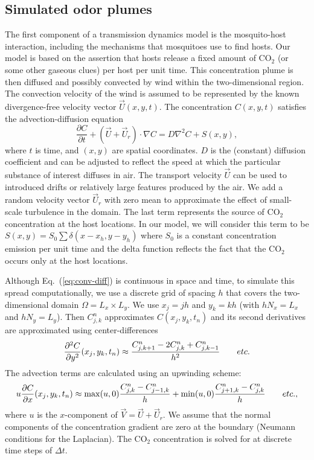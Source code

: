 \documentclass[12pt]{article}
\newif\ifcommentsw
\newcommand{\comment}[1]{\ifcommentsw  $\blacktriangleright$\ \textbf{#1}\ $\blacktriangleleft$ \fi}
\begin{document}
	\subsection{Simulated odor plumes}
 	The first component of a transmission dynamics model is the mosquito-host
		interaction, including the mechanisms that mosquitoes use to find hosts.  Our model is based on
		the assertion that hosts release a fixed amount of CO$_2$ (or some other gaseous clues) per host per
		unit time.  This concentration plume is then diffused and possibly convected by wind within the
		two-dimensional region. The convection velocity of the wind is assumed to be represented by
		the known divergence-free velocity vector ${\vec U}(x,y,t)$.  The concentration $C(x,y,t)$ satisfies the
		advection-diffusion equation
		\begin{equation}\label{eq:conv-diff}
		\frac{\partial C}{\partial t} + ({\vec U + \vec U_r})\cdot\nabla C = D\nabla^2 C + S(x,y),
		\end{equation}
		where $t$ is time, and $(x,y)$ are spatial coordinates.  $D$ is the (constant) diffusion coefficient
		and can be adjusted to reflect the speed at which the particular substance of interest diffuses in air.
		The transport velocity ${\vec U}$ can be used to introduced drifts or relatively large features
		produced by the air. We add a random velocity vector $\vec U_r$ with zero mean to approximate the effect of small-scale turbulence in the domain. \comment{Bree: Might want to reformulate in conservation form.} The last term
		represents the source of CO$_2$ concentration at the host locations. In our model, we will consider
		this term to be $S(x,y) = S_0 \sum \delta(x-x_h,y-y_h)$ where $S_0$ is a constant concentration emission per
		unit time and the delta function reflects the fact that the CO$_2$ occurs only at the host locations.
		
		Although Eq.~(\ref{eq:conv-diff}) is continuous in space and time, to simulate this spread
		computationally, we use a discrete grid of spacing $h$ that covers the two-dimensional
		domain $\Omega = L_x \times L_y$. We use $x_j = jh$ and $y_k = kh$ (with $h N_x = L_x$ and $h N_y = L_y$).
		Then $C^n_{j,k}$ approximates $C(x_j,y_k,t_n)$ and its second derivatives are approximated
		using center-differences
		\[
		\frac{\partial^2 C}{\partial y^2}(x_j,y_k,t_n) \approx \frac{ C^n_{j,k+1} - 2C^n_{j,k} + C^n_{j,k-1} }{h^2}
		\hskip20pt etc.
		\]
		The advection terms are calculated using an upwinding scheme:
		\[
		u\frac{\partial C}{\partial x}(x_j,y_k,t_n) \approx \max({u,0})\frac{C^n_{j,k} - C^n_{j-1,k}}{h} + \min({u,0})\frac{C^n_{j+1,k} - C^n_{j,k}}{h}
		\hskip20pt etc.,
		\]	
		where $u$ is the $x$-component of $\vec V = \vec U + \vec U_r$. We assume that the normal components of the concentration gradient are zero at the boundary (Neumann conditions for the Laplacian). \comment{Bree: We actually have outflow conditions -- might want to explain a little more rigorously.} The CO$_2$ concentration is solved for at discrete time steps of $\Delta t$. 
		
\end{document}

